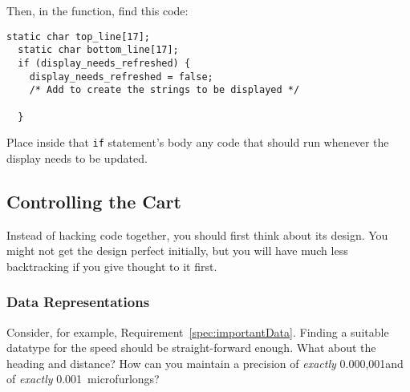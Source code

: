 Then, in the  function, find this code:
\begin{lstlisting}[basicstyle=\small]
  static char top_line[17];
  static char bottom_line[17];
  if (display_needs_refreshed) {
    display_needs_refreshed = false;
    /* Add to create the strings to be displayed */

  }
\end{lstlisting}

Place inside that \lstinline{if} statement's body any code that should run whenever the display needs to be updated.


\subsection{Controlling the Cart}

Instead of hacking code together, you should first think about its design.
You might not get the design perfect initially, but you will have much less backtracking if you give thought to it first.

\subsubsection{Data Representations}

Consider, for example, Requirement~\ref{spec:importantData}.
Finding a suitable datatype for the speed should be straight-forward enough.
What about the heading and distance?
How can you maintain a precision of \textit{exactly} 0.000,001\textdegree and of \textit{exactly} 0.001~microfurlongs?


